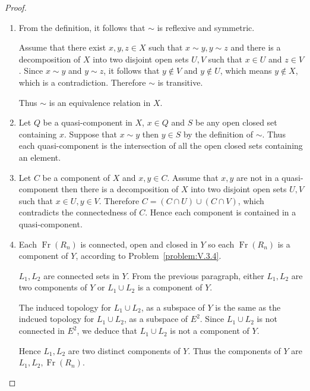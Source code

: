 \begin{proof}
	\begin{enumerate}[label={(\alph*)}]
		\item From the definition, it follows that \( \sim \) is reflexive and symmetric.

		      Assume that there exist \( x, y, z \in X \) such that \( x \sim y, y \sim z \) and there is a decomposition of \(X\) into two disjoint open sets \( U, V \) such that \( x \in U \) and \( z \in V \). Since \( x \sim y \) and \( y \sim z \), it follows that \( y \notin V \) and \( y \notin U \), which means \( y \notin X \), which is a contradiction. Therefore \( \sim \) is transitive.

		      Thus \( \sim \) is an equivalence relation in \(X\).
		\item Let \( Q \) be a quasi-component in \( X \), \( x \in Q \) and \( S \) be any open closed set containing \( x \). Suppose that \( x \sim y \) then \( y \in S \) by the definition of \( \sim \). Thus each quasi-component is the intersection of all the open closed sets containing an element.
		\item Let \( C \) be a component of \( X \) and \( x, y \in C \). Assume that \( x, y \) are not in a quasi-component then there is a decomposition of \( X \) into two disjoint open sets \( U, V \) such that \( x \in U, y \in V \). Therefore \( C = (C \cap U) \cup (C \cap V) \), which contradicts the connectedness of \( C \). Hence each component is contained in a quasi-component.
		\item Each \( \operatorname{Fr}(R_{n}) \) is connected, open and closed in \( Y \) so each \( \operatorname{Fr}(R_{n}) \) is a component of \( Y \), according to Problem~\ref{problem:V.3.4}.

		      \( L_{1}, L_{2} \) are connected sets in \( Y \). From the previous paragraph, either \( L_{1}, L_{2} \) are two components of \( Y \) or \( L_{1} \cup L_{2} \) is a component of \( Y \).

		      The induced topology for \( L_{1} \cup L_{2} \), as a subspace of \( Y \) is the same as the indcued topology for \( L_{1} \cup L_{2} \), as a subspace of \( E^{2} \). Since \( L_{1} \cup L_{2} \) is not connected in \( E^{2} \), we deduce that \( L_{1} \cup L_{2} \) is not a component of \( Y \).

		      Hence \( L_{1}, L_{2} \) are two distinct components of \( Y \). Thus the components of \( Y \) are \( L_{1}, L_{2}, \operatorname{Fr}(R_{n}) \).


\end{enumerate}
\end{proof}
